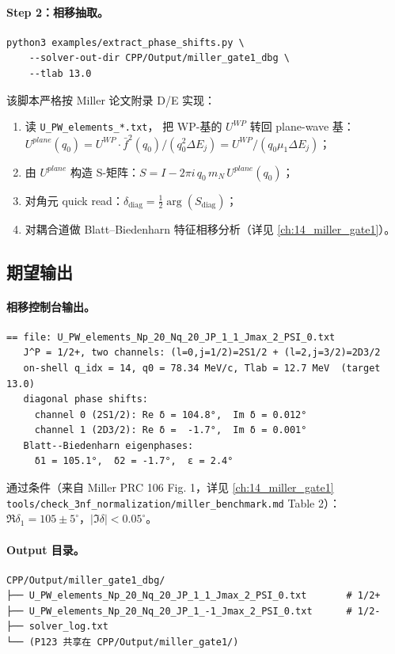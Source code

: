 \paragraph{Step 2：相移抽取。}
\begin{lstlisting}[style=config]
python3 examples/extract_phase_shifts.py \
    --solver-out-dir CPP/Output/miller_gate1_dbg \
    --tlab 13.0
\end{lstlisting}
该脚本严格按 Miller 论文附录 D/E 实现：
\begin{enumerate}
  \item 读 \texttt{U\_PW\_elements\_*.txt}，
        把 WP-基的 $U^{WP}$ 转回 plane-wave 基：
        $U^{plane}(q_0) = U^{WP} \cdot \bar{f}^2(q_0) / (q_0^2 \Delta E_j)
                        = U^{WP} / (q_0 \mu_1 \Delta E_j)$；
  \item 由 $U^{plane}$ 构造 S-矩阵：$S = I - 2\pi i\, q_0\, m_N\, U^{plane}(q_0)$；
  \item 对角元 quick read：$\delta_{\text{diag}} = \tfrac{1}{2}\arg(S_{\text{diag}})$；
  \item 对耦合道做 Blatt--Biedenharn 特征相移分析（详见 \cref{ch:14_miller_gate1}）。
\end{enumerate}

\subsection{期望输出}
\label{sec:ch20-s4-expect}

\paragraph{相移控制台输出。}
\begin{lstlisting}[style=config]
== file: U_PW_elements_Np_20_Nq_20_JP_1_1_Jmax_2_PSI_0.txt
   J^P = 1/2+, two channels: (l=0,j=1/2)=2S1/2 + (l=2,j=3/2)=2D3/2
   on-shell q_idx = 14, q0 = 78.34 MeV/c, Tlab = 12.7 MeV  (target 13.0)
   diagonal phase shifts:
     channel 0 (2S1/2): Re δ = 104.8°,  Im δ = 0.012°
     channel 1 (2D3/2): Re δ =  -1.7°,  Im δ = 0.001°
   Blatt--Biedenharn eigenphases:
     δ1 = 105.1°,  δ2 = -1.7°,  ε = 2.4°
\end{lstlisting}
通过条件（来自 Miller PRC 106 Fig. 1，详见 \cref{ch:14_miller_gate1} \texttt{tools/check\_3nf\_normalization/miller\_benchmark.md} Table 2）：
$\Re \delta_1 = 105 \pm 5^\circ$，$|\Im \delta| < 0.05^\circ$。

\paragraph{Output 目录。}
\begin{lstlisting}[style=config]
CPP/Output/miller_gate1_dbg/
├── U_PW_elements_Np_20_Nq_20_JP_1_1_Jmax_2_PSI_0.txt       # 1/2+
├── U_PW_elements_Np_20_Nq_20_JP_1_-1_Jmax_2_PSI_0.txt      # 1/2-
├── solver_log.txt
└── (P123 共享在 CPP/Output/miller_gate1/)
\end{lstlisting}

